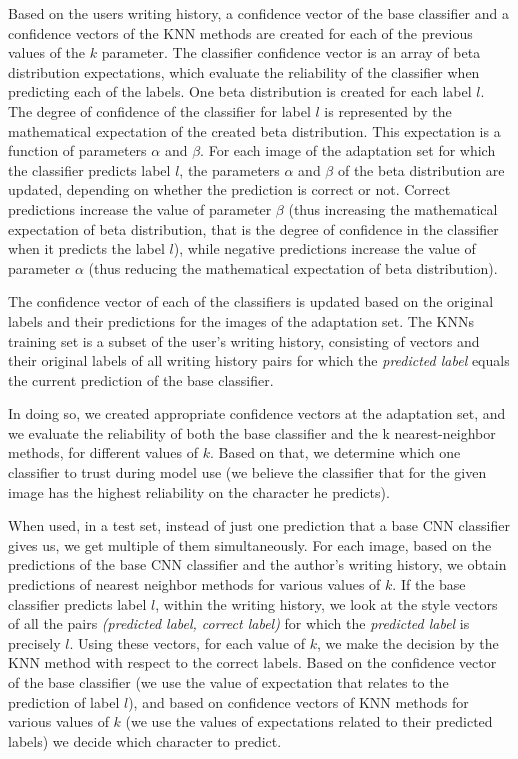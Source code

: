 \documentclass{article}
\begin{document}
Based on the users writing history, a confidence vector of the base classifier and a confidence vectors of the KNN methods are created for each of the previous values of the $k$ parameter. 
The classifier confidence vector is an array of beta distribution expectations, which evaluate the reliability of the classifier when predicting each of the labels. 
One beta distribution is created for each label $l$. 
The degree of confidence of the classifier for label $l$ is represented by the mathematical expectation of the created beta distribution. 
This expectation is a function of parameters $\alpha$  and $\beta$. 
For each image of the adaptation set for which the classifier predicts label $l$, the parameters $\alpha$  and $\beta$ of the beta distribution are updated, depending on whether the prediction is correct or not. 
Correct predictions increase the value of parameter $\beta$ 
(thus increasing the mathematical expectation of beta distribution, that is the degree of confidence in the classifier when it predicts the label $l$), 
while negative predictions increase the value of parameter $\alpha$ 
(thus reducing the mathematical expectation of beta distribution). 

The confidence vector of each of the classifiers is updated based on the original labels and their predictions for the images of the adaptation set. 
The KNNs training set is a subset of the user's writing history, consisting of vectors and their original labels of all writing history pairs for 
which the \textit{predicted label} equals the current prediction of the base classifier. 

In doing so, we created appropriate confidence vectors at the adaptation set, and we evaluate the reliability of both the base classifier and the k nearest-neighbor methods, for different values of $k$. 
Based on that, we determine which one classifier to trust during model use (we believe the classifier that for the given image has the highest reliability on the character he predicts). 

When used, in a test set, instead of just one prediction that a base CNN classifier gives us, we get multiple of them simultaneously. 
For each image, based on the predictions of the base CNN classifier and the author's writing history, we obtain predictions of nearest neighbor methods for various values of $k$. 
If the base classifier predicts label $l$, within the writing history, we look at the style vectors of all the pairs \textit{(predicted label, correct label)} for which the \textit{predicted label} is precisely $l$. 
Using these vectors, for each value of $k$, we make the decision by the KNN method with respect to the correct labels. 
Based on the confidence vector of the base classifier (we use the value of expectation that relates to the prediction of label $l$), and based on confidence vectors of KNN methods for various values of $k$ 
(we use the values of expectations related to their predicted labels) we decide which character to predict. 
\end{document}
